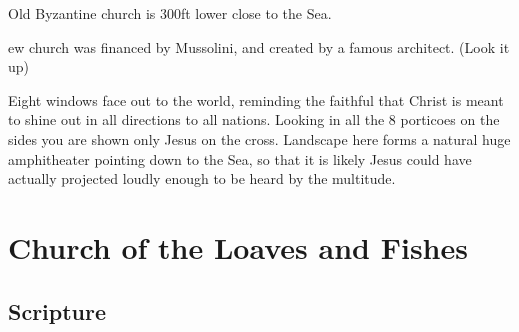 \documentclass[letterpaper]{report}
\begin{document}
Old Byzantine church is 300ft lower close to the Sea.
 
ew church was financed by Mussolini, and created by a famous architect. (Look it up)

Eight windows face out to the world,
reminding the faithful that Christ is meant to shine out in all directions to all nations.
Looking in all the 8 porticoes on the sides you are shown only Jesus on the cross.
Landscape here forms a natural huge amphitheater pointing down to the Sea, so that it is likely Jesus could have actually projected loudly enough to be heard by the multitude.

\clearpage
\section{Church of the Loaves and Fishes}
\begin{multicols}{2}
	\mbox{}
\end{multicols}
\subsection{Scripture}
\end{document}
